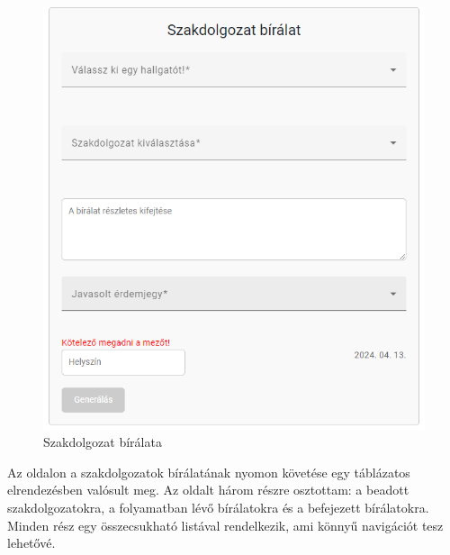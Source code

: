 \begin{figure}[h!]
\centering
\includegraphics[scale=0.5]{images/Review.png}
\caption{Szakdolgozat bírálata}
\label{fig:Review}
\end{figure}

\newpage


Az oldalon a szakdolgozatok bírálatának nyomon követése egy táblázatos elrendezésben valósult meg. Az oldalt három részre osztottam: a beadott szakdolgozatokra, a folyamatban lévő bírálatokra és a befejezett bírálatokra. Minden rész egy összecsukható listával rendelkezik, ami könnyű navigációt tesz lehetővé.

